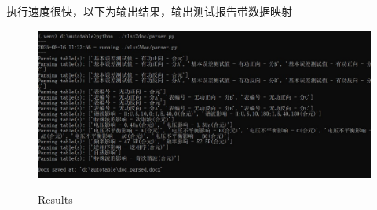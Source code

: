 执行速度很快，以下为输出结果，输出测试报告带数据映射

\begin{figure}[H]
    \begin{center}
        \includegraphics[width=.95\linewidth]{res/results.jpg}\\
        \caption{Results}\label{resultes}
    \end{center}
\end{figure}

